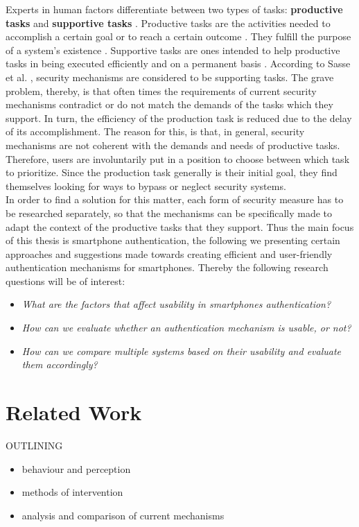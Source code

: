Experts in human factors differentiate between two types of tasks: \textbf{productive tasks} and \textbf{supportive tasks} \cite{sasse}. Productive tasks are the activities needed to accomplish a certain goal or to reach a certain outcome \cite{sasse}. They fulfill the purpose of a system's existence \cite{sasse}. Supportive tasks are ones intended to help productive tasks in being executed efficiently and on a permanent basis \cite{sasse}. According to Sasse et al. \cite{sasse}, security mechanisms are considered to be supporting tasks. The grave problem, thereby, is that often times the requirements of current security mechanisms contradict or do not match the demands of the tasks which they support. In turn, the efficiency of the production task is reduced due to the delay of its accomplishment. The reason for this, is that, in general, security mechanisms are not coherent with the demands and needs of productive tasks. Therefore, users are involuntarily put in a position to choose between which task to prioritize. Since the production task generally is their initial goal, they find themselves looking for ways to bypass or neglect security systems. \\

In order to find a solution for this matter, each form of security measure has to be researched separately, so that the mechanisms can be specifically made to adapt the context of the productive tasks that they support. Thus the main focus of this thesis is smartphone authentication, the following we
presenting certain approaches and suggestions made towards creating efficient and user-friendly authentication mechanisms for smartphones. Thereby the following research questions will be of interest: 


\begin{itemize}
    \item \textit{What are the factors that affect usability in smartphones authentication?}
\item \textit{How can we evaluate whether an authentication mechanism is usable, or not?} 
    \item \textit{How can we compare multiple systems based on their usability and evaluate them accordingly?}
\end{itemize}


\section{Related Work}

OUTLINING
\begin{itemize}
    \item behaviour and perception
    \item methods of intervention
    \item analysis and comparison of current mechanisms
\end{itemize}

